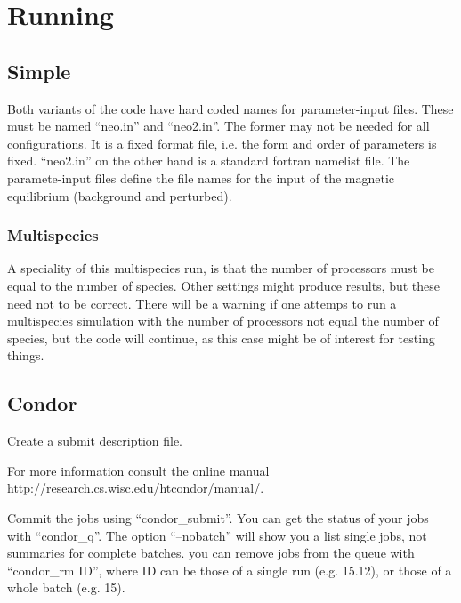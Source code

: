 \chapter{Running}

\section{Simple}
Both variants of the code have hard coded names for parameter-input
files. These must be named ``neo.in'' and ``neo2.in''. The former may
not be needed for all configurations. It is a fixed format file, i.e.
the form and order of parameters is fixed. ``neo2.in'' on the other hand
is a standard fortran namelist file.
The paramete-input files define the file names for the input of the
magnetic equilibrium (background and perturbed).

\subsection{Multispecies}
A speciality of this multispecies run, is that the number of processors
must be equal to the number of species. Other settings might produce
results, but these need not to be correct.
There will be a warning if one attemps to run a multispecies simulation
with the number of processors not equal the number of species, but the
code will continue, as this case might be of interest for testing
things.

\section{Condor}

Create a submit description file.

For more information consult the online manual http://research.cs.wisc.edu/htcondor/manual/.

Commit the jobs using ``condor\_submit''.
You can get the status of your jobs with ``condor\_q''. The option
``--nobatch'' will show you a list single jobs, not summaries for
complete batches.
you can remove jobs from the queue with ``condor\_rm ID'', where ID can
be those of a single run (e.g. 15.12), or those of a whole batch (e.g.
15).
